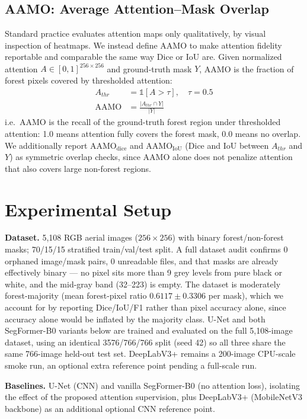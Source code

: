 \documentclass[sigconf,review]{acmart}
\begin{document}
\subsection{AAMO: Average Attention--Mask Overlap}
Standard practice evaluates attention maps only qualitatively, by visual
inspection of heatmaps. We instead define AAMO to make attention fidelity
reportable and comparable the same way Dice or IoU are. Given normalized
attention $A \in [0,1]^{256\times256}$ and ground-truth mask $Y$, AAMO is the
fraction of forest pixels covered by thresholded attention:
\begin{align}
A_{thr} &= \mathbb{1}[A > \tau], \quad \tau = 0.5 \\
\mathrm{AAMO} &= \frac{|A_{thr} \cap Y|}{|Y|}
\end{align}
i.e.\ AAMO is the recall of the ground-truth forest region under
thresholded attention: 1.0 means attention fully covers the forest mask,
0.0 means no overlap. We additionally report $\mathrm{AAMO_{dice}}$ and
$\mathrm{AAMO_{IoU}}$ (Dice and IoU between $A_{thr}$ and $Y$) as symmetric
overlap checks, since AAMO alone does not penalize attention that also
covers large non-forest regions.

\section{Experimental Setup}
\textbf{Dataset.} 5{,}108 RGB aerial images ($256{\times}256$) with binary
forest/non-forest masks; 70/15/15 stratified train/val/test split. A full
dataset audit confirms 0 orphaned image/mask pairs, 0 unreadable files, and
that masks are already effectively binary --- no pixel sits more than 9 grey
levels from pure black or white, and the mid-gray band (32--223) is empty.
The dataset is moderately forest-majority (mean forest-pixel ratio
$0.6117 \pm 0.3306$ per mask), which we account for by reporting Dice/IoU/F1
rather than pixel accuracy alone, since accuracy alone would be inflated by
the majority class.
U-Net and both SegFormer-B0 variants below are trained and evaluated on the
full 5{,}108-image dataset, using an identical 3576/766/766 split (seed 42)
so all three share the same 766-image held-out test set. DeepLabV3+ remains
a 200-image CPU-scale smoke run, an optional extra reference point pending a
full-scale run.

\textbf{Baselines.} U-Net (CNN) and vanilla SegFormer-B0 (no attention
loss), isolating the effect of the proposed attention supervision, plus
DeepLabV3+ (MobileNetV3 backbone) as an additional optional CNN reference
point.
\end{document}
